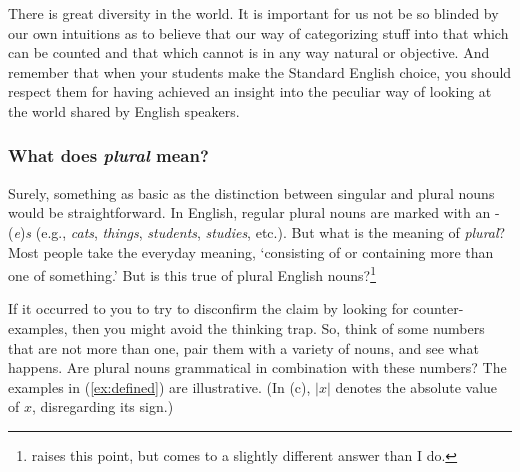 There is great diversity in the world. It is important for us not be so blinded by our own intuitions as to believe that our way of categorizing stuff into that which can be counted and that which cannot is in any way natural or objective. And remember that when your students make the Standard English choice, you should respect them for having achieved an insight into the peculiar way of looking at the world shared by English speakers.

\subsubsection*{What does \textit{plural} mean?} \label{sec:plural-meaning}

Surely, something as basic as the distinction between singular and plural nouns would be straightforward. In English, regular plural nouns are marked with an -(\textit{e})\textit{s} (e.g., \textit{cats}, \textit{things}, \textit{students}, \textit{studies}, etc.). But what is the meaning of \textit{plural}? Most people take the everyday meaning, `consisting of or containing more than one of something.' But is this true of plural English nouns?\footnote{\citet{hauser2009} raises this point, but comes to a slightly different answer than I do.}

If it occurred to you to try to disconfirm the claim by looking for counter-examples, then you might avoid the thinking trap. So, think of some numbers that are not more than one, pair them with a variety of nouns, and see what happens. Are plural nouns grammatical in combination with these numbers? The examples in (\ref{ex:defined}) are illustrative. (In (c), $|x|$ denotes the absolute value of $x$, disregarding its sign.)

\ea \label{ex:defined}
    \z
\z

